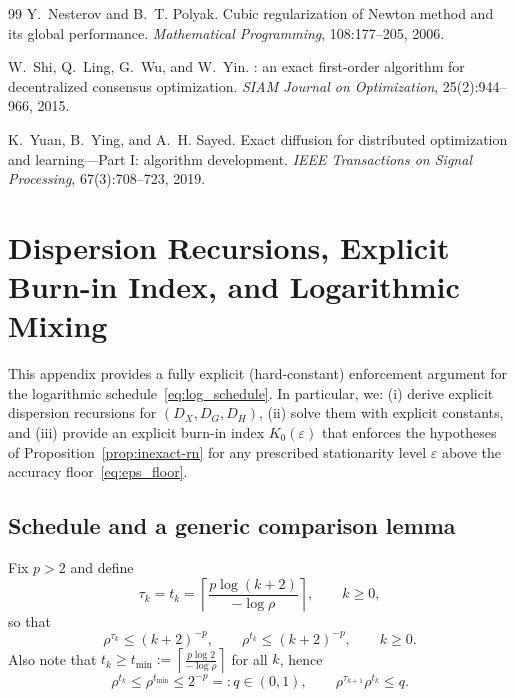 \documentclass[11pt,a4paper]{article}
\begin{document}
\begin{thebibliography}{99}
	Y.~Nesterov and B.~T. Polyak.
	\newblock Cubic regularization of {N}ewton method and its global performance.
	\newblock \emph{Mathematical Programming}, 108:177--205, 2006.
	
	W.~Shi, Q.~Ling, G.~Wu, and W.~Yin.
	: an exact first-order algorithm for decentralized consensus optimization.
	\newblock \emph{SIAM Journal on Optimization}, 25(2):944--966, 2015.
	
	K.~Yuan, B.~Ying, and A.~H. Sayed.
	\newblock Exact diffusion for distributed optimization and learning---Part {I}: algorithm development.
	\newblock \emph{IEEE Transactions on Signal Processing}, 67(3):708--723, 2019.
\end{thebibliography}

\appendix

\section{Dispersion Recursions, Explicit Burn-in Index, and Logarithmic Mixing}\label{app:dispersion}
This appendix provides a fully explicit (hard-constant) enforcement argument for the logarithmic
schedule~\eqref{eq:log_schedule}. In particular, we:
(i) derive explicit dispersion recursions for $(D_X,D_G,D_H)$,
(ii) solve them with explicit constants, and
(iii) provide an explicit burn-in index $K_0(\varepsilon)$ that enforces the hypotheses of
Proposition~\ref{prop:inexact-rn} for any prescribed stationarity level $\varepsilon$ above the
accuracy floor~\eqref{eq:eps_floor}.

\subsection{Schedule and a generic comparison lemma}

Fix $p>2$ and define
\[
\tau_k=t_k=\left\lceil\frac{p\log(k+2)}{-\log\rho}\right\rceil,\qquad k\ge 0,
\]
so that
\begin{equation}\label{eq:rho_poly_app}
	\rho^{\tau_k}\le (k+2)^{-p},\qquad \rho^{t_k}\le (k+2)^{-p},\qquad k\ge 0.
\end{equation}
Also note that $t_k\ge t_{\min}:=\left\lceil\frac{p\log 2}{-\log\rho}\right\rceil$ for all $k$, hence
\begin{equation}\label{eq:q_def_app}
	\rho^{t_k}\le \rho^{t_{\min}}\le 2^{-p}=:q\in(0,1),\qquad
	\rho^{\tau_{k+1}}\rho^{t_k}\le q.
\end{equation}
\end{document}
